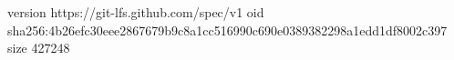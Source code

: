 version https://git-lfs.github.com/spec/v1
oid sha256:4b26efc30eee2867679b9c8a1cc516990c690e0389382298a1edd1df8002c397
size 427248
